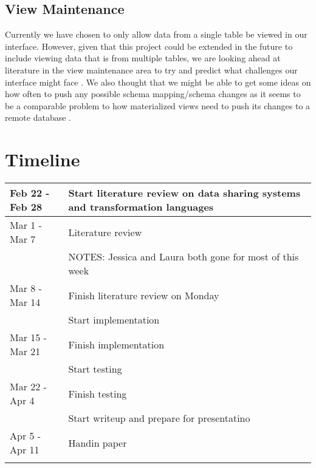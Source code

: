 \documentclass[12pt]{article}
\begin{document}
\subsection{View Maintenance}
Currently we have chosen to only allow data from a single table be viewed in our interface. However, given that this project could be extended in the future to include viewing data that is from multiple tables, we are looking ahead at literature in the view maintenance area to try and predict what challenges our interface might face \cite{ agrawal1997efficient, agrawal2009asynchronous, gupta1999materialized, zhou2007lazy}. We also thought that we might be able to get some ideas on how often to push any possible schema mapping/schema changes as it seems to be a comparable problem to how materialized views need to push its changes to a remote database \cite{agrawal1997efficient, agrawal2009asynchronous, zhou2007lazy}. 

\section{Timeline}
\begin{tabular}{| l | l |}
\hline
Feb 22 - Feb 28 & Start literature review on data sharing systems and transformation languages\\
\hline
Mar 1 - Mar 7 & Literature review \\
& NOTES: Jessica and Laura both gone for most of this week \\
\hline
Mar 8 - Mar 14 & Finish literature review on Monday\\
& Start implementation\\
\hline
Mar 15 - Mar 21 & Finish implementation\\
& Start testing\\
\hline
Mar 22 - Apr 4 & Finish testing\\
& Start writeup and prepare for presentatino\\
\hline
Apr 5 - Apr 11 & Handin paper\\
&\\
\hline
\end{tabular}
\newpage


\end{document}
